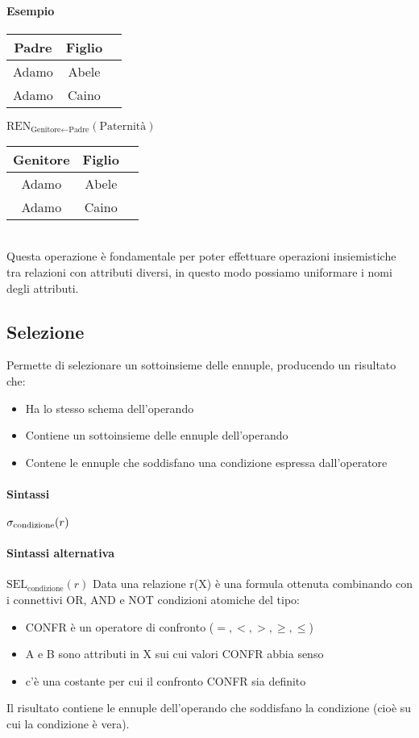 \paragraph*{Esempio}
\begin{tabular}{|c|c|c|}
    \hline
    \textbf{Padre} & \textbf{Figlio} \\
    \hline
    Adamo          & Abele           \\
    \hline
    Adamo          & Caino           \\
    \hline
\end{tabular}
$\text{REN}_{\text{Genitore}\leftarrow\text{Padre}}(\text{Paternità})$
\begin{tabular}{|c|c|c|}
    \hline
    \textbf{Genitore} & \textbf{Figlio} \\
    \hline
    Adamo          & Abele           \\
    \hline
    Adamo          & Caino           \\
    \hline
\end{tabular}\\
Questa operazione è fondamentale per poter effettuare operazioni insiemistiche tra
relazioni con attributi diversi, in questo modo possiamo uniformare i nomi degli attributi.
\subsection{Selezione}
Permette di selezionare un sottoinsieme delle ennuple, producendo un risultato che:
\begin{itemize}
    \item Ha lo stesso schema dell'operando
    \item Contiene un sottoinsieme delle ennuple dell'operando
    \item Contene le ennuple che soddisfano una condizione espressa dall'operatore
\end{itemize}
\paragraph*{Sintassi} $\sigma_{\text{condizione}}(r) \\$
\paragraph*{Sintassi alternativa}$\text{SEL}_{\text{condizione}}(r)$
Data una relazione r(X) è una formula ottenuta combinando con i connettivi OR, AND e NOT
condizioni atomiche del tipo:
\begin{itemize}
    \item CONFR è un operatore di confronto ($=, <, >, \geq, \leq$)
    \item A e B sono attributi in X sui cui valori CONFR abbia senso
    \item c'è una costante per cui il confronto CONFR sia definito
\end{itemize}
Il risultato contiene le ennuple dell'operando che soddisfano la condizione (cioè su cui
la condizione è vera).

